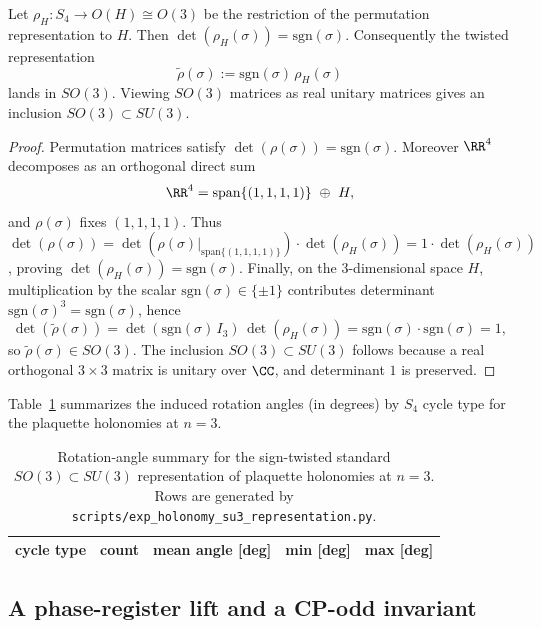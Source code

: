 \begin{lemma}\label{lem:s4_so3_twist}
Let $\rho_H:S_4\to O(H)\cong O(3)$ be the restriction of the permutation representation to $H$.
Then $\det(\rho_H(\sigma))=\mathrm{sgn}(\sigma)$.
Consequently the twisted representation
\[
\widetilde\rho(\sigma):=\mathrm{sgn}(\sigma)\,\rho_H(\sigma)
\]
lands in $SO(3)$.
Viewing $SO(3)$ matrices as real unitary matrices gives an inclusion $SO(3)\subset SU(3)$.
\end{lemma}
\begin{proof}
Permutation matrices satisfy $\det(\rho(\sigma))=\mathrm{sgn}(\sigma)$.
Moreover $\RR^4$ decomposes as an orthogonal direct sum
\[
\RR^4=\mathrm{span}\{(1,1,1,1)\}\ \oplus\ H,
\]
and $\rho(\sigma)$ fixes $(1,1,1,1)$.
Thus $\det(\rho(\sigma))=\det(\rho(\sigma)|_{\mathrm{span}\{(1,1,1,1)\}})\cdot \det(\rho_H(\sigma))=1\cdot \det(\rho_H(\sigma))$, proving $\det(\rho_H(\sigma))=\mathrm{sgn}(\sigma)$.
Finally, on the $3$-dimensional space $H$, multiplication by the scalar $\mathrm{sgn}(\sigma)\in\{\pm 1\}$ contributes determinant $\mathrm{sgn}(\sigma)^3=\mathrm{sgn}(\sigma)$, hence
\[
\det(\widetilde\rho(\sigma))=\det(\mathrm{sgn}(\sigma)\,I_3)\,\det(\rho_H(\sigma))=\mathrm{sgn}(\sigma)\cdot \mathrm{sgn}(\sigma)=1,
\]
so $\widetilde\rho(\sigma)\in SO(3)$.
The inclusion $SO(3)\subset SU(3)$ follows because a real orthogonal $3\times 3$ matrix is unitary over $\CC$, and determinant $1$ is preserved.
\end{proof}
Table~\ref{tab:holonomy_su3_rotation} summarizes the induced rotation angles (in degrees) by $S_4$ cycle type for the plaquette holonomies at $n=3$.

\begin{table}[t]
\centering
\small
\setlength{\tabcolsep}{10pt}
\renewcommand{\arraystretch}{1.15}
\begin{tabular}{lrrrr}
\toprule
cycle type & count & mean angle [deg] & min [deg] & max [deg] \\
\midrule
%
\end{tabular}
\caption{Rotation-angle summary for the sign-twisted standard $SO(3)\subset SU(3)$ representation of plaquette holonomies at $n=3$. Rows are generated by \texttt{scripts/exp\_holonomy\_su3\_representation.py}.}
\label{tab:holonomy_su3_rotation}
\end{table}

\subsection{A phase-register lift and a CP-odd invariant}
\label{subsec:holonomy_phase_lift_cp}

